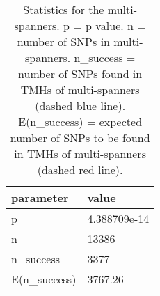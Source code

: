 \begin{table}

\caption{\label{tab:snp_stats_per_spanner_multi}Statistics for the multi-spanners. p = p value. n = number of SNPs in multi-spanners. n\_success = number of SNPs found in TMHs of multi-spanners (dashed blue line). E(n\_success) = expected number of SNPs to be found in TMHs of multi-spanners  (dashed red line). }
\centering
\begin{tabular}[t]{l|l}
\hline
parameter & value\\
\hline
p & 4.388709e-14\\
\hline
n & 13386\\
\hline
n\_success & 3377\\
\hline
E(n\_success) & 3767.26\\
\hline
\end{tabular}
\end{table}